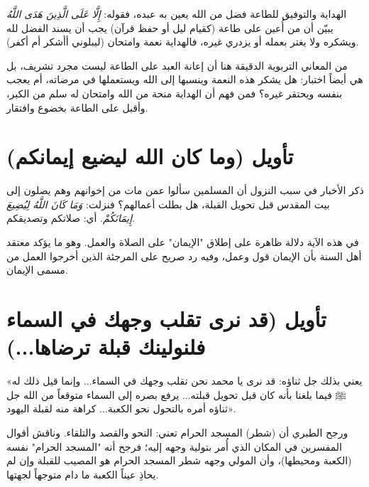 \begin{fawaid}
الهداية والتوفيق للطاعة فضل من الله يعين به عبده، فقوله: \textit{إِلَّا عَلَى الَّذِينَ هَدَى اللَّهُ} يبيّن أن من أُعين على طاعة (كقيام ليل أو حفظ قرآن) يجب أن يسند الفضل لله ويشكره ولا يغتر بعمله أو يزدري غيره، فالهداية نعمة وامتحان (ليبلوني أأشكر أم أكفر).
\end{fawaid}

\begin{fawaid}
من المعاني التربوية الدقيقة هنا أن إعانة العبد على الطاعة ليست مجرد تشريف، بل هي أيضاً اختبار: هل يشكر هذه النعمة وينسبها إلى الله ويستعملها في مرضاته، أم يعجب بنفسه ويحتقر غيره؟ فمن فهم أن الهداية منحة من الله وامتحان له سلم من الكبر، وأقبل على الطاعة بخضوع وافتقار.
\end{fawaid}

\separator

\section{تأويل (وما كان الله ليضيع إيمانكم)}
ذكر  الأخبار في سبب النزول أن المسلمين سألوا عمن مات من إخوانهم وهم يصلون إلى بيت المقدس قبل تحويل القبلة، هل بطلت أعمالهم؟ فنزلت: \textit{وَمَا كَانَ اللَّهُ لِيُضِيعَ إِيمَانَكُمْ}. أي: صلاتكم وتصديقكم.

\begin{fawaid}
في هذه الآية دلالة ظاهرة على إطلاق "الإيمان" على الصلاة والعمل. وهو ما يؤكد معتقد أهل السنة بأن الإيمان قول وعمل، وفيه رد صريح على المرجئة الذين أخرجوا العمل من مسمى الإيمان.
\end{fawaid}

\separator

\section{تأويل (قد نرى تقلب وجهك في السماء فلنولينك قبلة ترضاها...)}
 «يعني بذلك جل ثناؤه: قد نرى يا محمد نحن تقلب وجهك في السماء... وإنما قيل ذلك له ﷺ فيما بلغنا بأنه كان قبل تحويل قبلته... يرفع بصره إلى السماء متوقعاً من الله جل ثناؤه أمره بالتحول نحو الكعبة... كراهة منه لقبلة اليهود».

ورجح الطبري أن (شطر) المسجد الحرام تعني: النحو والقصد والتلقاء. وناقش أقوال المفسرين في المكان الذي أُمر بتولية وجهه إليه؛ فرجح أنه "المسجد الحرام" نفسه (الكعبة ومحيطها)، وأن المولي وجهه شطر المسجد الحرام هو المصيب للقبلة وإن لم يحاذِ عيناً الكعبة ما دام متوجهاً لجهتها.

